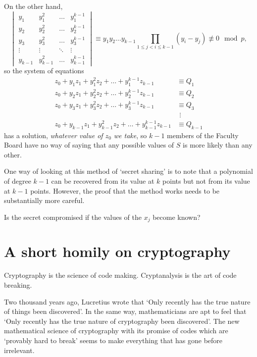 On the other hand,
\[
\begin{vmatrix}
y_{1}&y_{1}^{2}&\hdots&y_{1}^{k-1}\\
y_{2}&y_{2}^{2}&\hdots&y_{2}^{k-1}\\
y_{3}&y_{3}^{2}&\hdots&y_{3}^{k-1}\\
\vdots&\vdots&\ddots&\vdots\\
y_{k-1}&y_{k-1}^{2}&\hdots&y_{k-1}^{k-1}
\end{vmatrix}
\equiv y_{1}y_{2}\ldots y_{k-1}
\prod_{1\leq j<i\leq k-1}(y_{i}-y_{j})\not\equiv 0\mod{p},\]
so the system of equations
\begin{align*}
z_{0}+y_{1}z_{1}+y_{1}^{2}z_{2}+\hdots+y_{1}^{k-1}z_{k-1}
&\equiv Q_{1}\\
z_{0}+y_{2}z_{1}+y_{2}^{2}z_{2}+\hdots+y_{2}^{k-1}z_{k-1}
&\equiv Q_{2}\\
z_{0}+y_{3}z_{1}+y_{3}^{2}z_{2}+\hdots+y_{3}^{k-1}z_{k-1}
&\equiv Q_{3}\\
&\ \,\vdots\\
z_{0}+y_{k-1}z_{1}+y_{k-1}^{2}z_{2}+
\hdots+y_{k-1}^{k-1}z_{k-1}&\equiv Q_{k-1}
\end{align*}
has a solution, \emph{whatever value of $z_{0}$ we take},
so $k-1$ members of the Faculty Board have no
way of saying that any possible values of $S$ is
more likely than any other.

One way of looking at this method of `secret sharing'
is to note that a polynomial
of degree $k-1$ can be recovered from its value at $k$ points
but not from its value at $k-1$ points. However, the proof
that the method works needs to be substantially more careful.
\begin{exercise} Is the secret compromised if the
values of the $x_{j}$ become known?
\end{exercise}    
\section{A short homily on cryptography}
Cryptography is the science of
code making. Cryptanalysis is the
art of
code  breaking.

Two thousand years ago, Lucretius wrote that
`Only recently has the true nature of things
been discovered'. In the same way, mathematicians
are apt to feel that `Only recently has
the true nature of cryptography been
discovered'. The new mathematical science
of cryptography with its promise of codes
which are `provably hard to break' seems
to make everything that has gone before
irrelevant.

